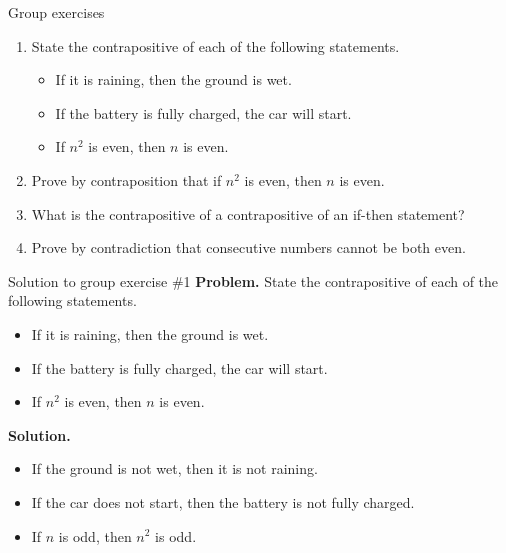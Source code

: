 \documentclass[10pt]{beamer}
\begin{document}
\begin{frame}{Group exercises}
\begin{enumerate}
	\item State the contrapositive of each of the following statements.
	\begin{itemize}
	\item[a.] If it is raining, then the ground is wet.
	\item[b.] If the battery is fully charged, the car will start.
	\item[c.] If $n^2$ is even, then $n$ is even. 
	\end{itemize}
	\item Prove by contraposition that if $n^2$ is even, then $n$ is even. 
	\item What is the contrapositive of a contrapositive of an if-then statement?
	\item Prove by contradiction that consecutive numbers cannot be both even.

\end{enumerate}

\end{frame}


\begin{frame}{Solution to group exercise \#1}
\colorbox{red!30}{\textbf{Problem.}} State the contrapositive of each of the following statements.
	\begin{itemize}
	\item[a.] If it is raining, then the ground is wet.
	\item[b.] If the battery is fully charged, the car will start.
	\item[c.] If $n^2$ is even, then $n$ is even.

	\end{itemize}
\vfill 
\colorbox{green!30}{\textbf{Solution.}}
	\begin{itemize}
	\item[a.] If the ground is not wet, then it is not raining.
	\item[b.] If the car does not start, then the battery is not fully charged.
	\item[c.] If $n$ is odd, then $n^2$ is odd.

	\end{itemize}

\end{frame}
\end{document}
